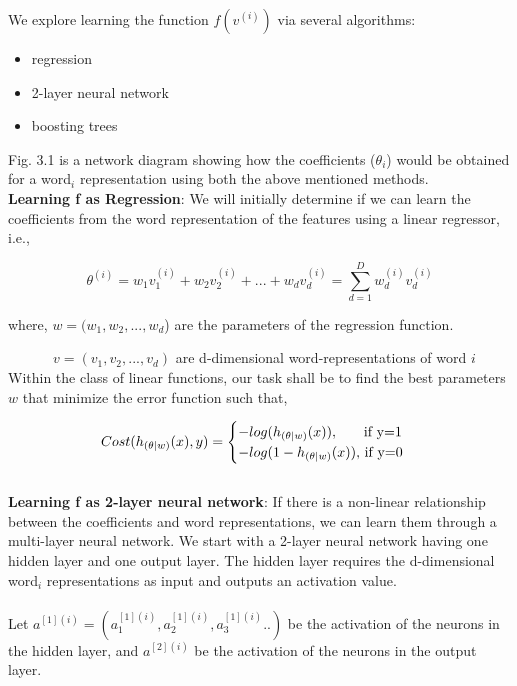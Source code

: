 

\noindent We explore learning the function $f(v^{(i)})$ via several algorithms:

\begin{itemize}
\item regression
\item 2-layer neural network
\item boosting trees
\end{itemize}

\noindent Fig. 3.1 is a network diagram showing how the coefficients ($\theta_{i}$) would be obtained for a word$_{i}$ representation using both the above mentioned methods.\\
\noindent\textbf{Learning f as Regression}: We will initially determine if we can learn the coefficients from the word representation of the features using a linear regressor, i.e., 

\begin{equation}
\theta^{(i)} = w_{1}v_{1}^{(i)} + w_{2}v_{2}^{(i)} + ... + w_{d}v_{d}^{(i)} = \sum_{d=1}^{D} w_{d}^{(i)}v_{d}^{(i)}
\end{equation}

where, $w = (w_{1}, w_{2}, ..., w_{d}$) are the parameters of the regression function. 

$\quad\qquad\  v= (v_{1}, v_{2}, ..., v_{d})$ are d-dimensional word-representations of word $i$\\

Within the class of linear functions, our task shall be to find the best parameters $w$ that minimize the error function such that,

\begin{equation}\label{cost_fn_eq}
Cost(h_{(\theta| w)}(x), y) = 
\begin{cases}
-log(h_{(\theta| w)}(x)), $\qquad if y=1$
\\
-log(1-h_{(\theta| w)}(x)), $ if y=0$
\end{cases}
\end{equation}\\
\noindent\textbf{Learning f as 2-layer neural network}: If there is a non-linear relationship between the coefficients and word representations, we can learn them through a multi-layer neural network. We start with a 2-layer neural network having one hidden layer and one output layer. The hidden layer requires the d-dimensional word$_{i}$ representations as input and outputs an activation value.\\\\ Let $a^{[1](i)} = (a^{[1](i)}_{1},a^{[1](i)}_{2},a^{[1](i)}_{3}..)$ be the activation of the neurons in the hidden layer, and $a^{[2](i)}$ be the activation of the neurons in the output layer.\\

